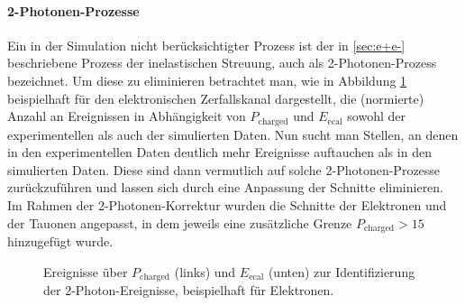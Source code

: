 \paragraph{2-Photonen-Prozesse}
Ein in der Simulation nicht berücksichtigter Prozess ist der in \ref{sec:e+e-} beschriebene Prozess der inelastischen Streuung, auch als 2-Photonen-Prozess bezeichnet. Um diese zu eliminieren betrachtet man, wie in Abbildung \ref{fig:2photon} beispielhaft für den elektronischen Zerfallskanal dargestellt, die (normierte) Anzahl an Ereignissen in Abhängigkeit von $P_\text{charged}$ und $E_\text{ecal}$ sowohl der experimentellen als auch der simulierten Daten. Nun sucht man Stellen, an denen in den experimentellen Daten deutlich mehr Ereignisse auftauchen als in den simulierten Daten. Diese sind dann vermutlich auf solche 2-Photonen-Prozesse zurückzuführen und lassen sich durch eine Anpassung der Schnitte eliminieren. Im Rahmen der 2-Photonen-Korrektur wurden die Schnitte der Elektronen und der Tauonen angepasst, in dem jeweils eine zusätzliche Grenze $P_\text{charged}>15$ hinzugefügt wurde.
\begin{figure}
	\centering
	\caption[Identifizierung der 2-Photon-Ereignisse]{Ereignisse über $P_\text{charged}$ (links) und $E_\text{ecal}$ (unten) zur Identifizierung der 2-Photon-Ereignisse, beispielhaft für Elektronen.}
	\label{fig:2photon}
\end{figure}

